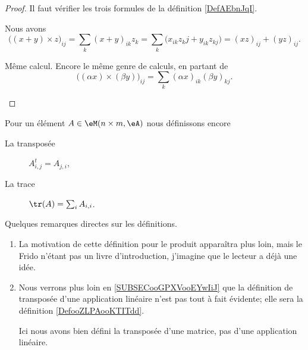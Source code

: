 \begin{proof}
	Il faut vérifier les trois formules de la définition \ref{DefAEbnJqI}.
	\begin{subproof}
		\spitem[Distribution (1)]
		Nous avons
		\begin{equation}
			\big( (x+y)\times z \big)_{ij}=\sum_k(x+y)_{ik}z_k=\sum_k\big( x_{ik}z_kj+y_{ik}z_{kj} \big)=(xz)_{ij}+(yz)_{ij}.
		\end{equation}

		\spitem[Distribution (2)]
		Même calcul.
		Encore le même genre de calculs, en partant de
		\begin{equation}
			\big( (\alpha x)\times (\beta y) \big)_{ij}=\sum_k(\alpha x)_{ik}(\beta y)_{kj}.
		\end{equation}
	\end{subproof}
\end{proof}

\begin{definition}
	Pour un élément \( A\in \eM(n\times m, \eA)\) nous définissons encore
	\begin{description}
		\item[La transposée] \( A^t_{i,j}=A_{j,i}\),
		\item[La trace] \( \tr(A)=\sum_iA_{i,i}\).
	\end{description}
\end{definition}


\begin{remark}
	Quelques remarques directes sur les définitions.
	\begin{enumerate}
		\item
		      La motivation de cette définition pour le produit apparaîtra plus loin, mais le Frido n'étant pas un livre d'introduction, j'imagine que le lecteur a déjà une idée.
		\item
		      Nous verrons plus loin en \ref{SUBSECooGPXVooEYwIiJ} que la définition de transposée d'une application linéaire n'est pas tout à fait évidente; elle sera la définition \ref{DefooZLPAooKTITdd}.

		      Ici nous avons bien défini la transposée d'une matrice, pas d'une application linéaire.
	\end{enumerate}
\end{remark}


